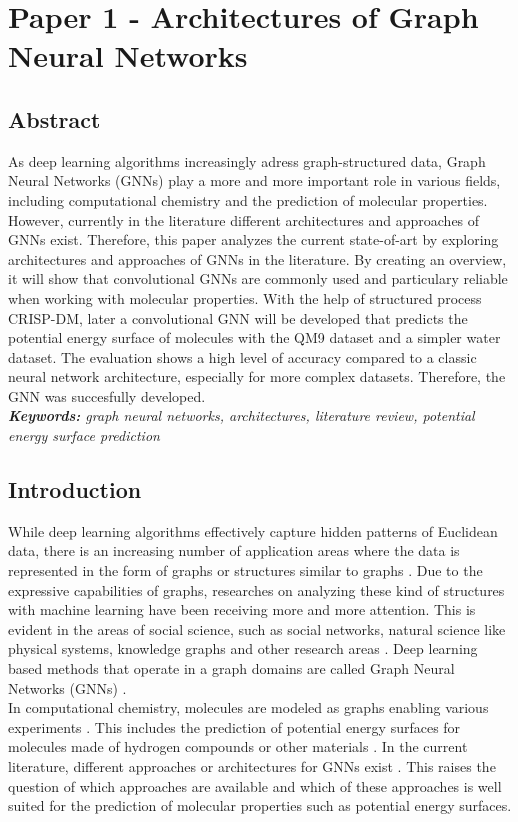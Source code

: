 
\chapter{Paper 1 - Architectures of Graph Neural Networks}

\section*{Abstract}

As deep learning algorithms increasingly adress graph-structured data, Graph Neural Networks (GNNs) play a more and more important role in various fields, including computational chemistry and the prediction of molecular properties. However, currently in the literature different architectures and approaches of GNNs exist. Therefore, this paper analyzes the current state-of-art by exploring architectures and approaches of GNNs in the literature. By creating an overview, it will show that convolutional GNNs are commonly used and particulary reliable when working with molecular properties. With the help of structured process CRISP-DM, later a convolutional GNN will be developed that predicts the potential energy surface of molecules with the QM9 dataset and a simpler water dataset. The evaluation shows a high level of accuracy compared to a classic neural network architecture, especially for more complex datasets. Therefore, the GNN was succesfully developed. \\


\textit{\textbf{Keywords:} graph neural networks, architectures, literature review, potential energy surface prediction}

\section{Introduction}
While deep learning algorithms effectively capture hidden patterns of Euclidean data, there is an increasing number of application areas where the data is represented in the form of graphs or structures similar to graphs \cite{wu_comprehensive_2021}. Due to the expressive capabilities of graphs, researches on analyzing these kind of structures with machine learning have been receiving more and more attention. This is evident in the areas of social science, such as social networks, natural science like physical systems, knowledge graphs and other research areas \cite{zhou_graph_2020}. Deep learning based methods that operate in a graph domains are called Graph Neural Networks (GNNs) \cite{velickovic_everything_2023}. \\ 
In computational chemistry, molecules are modeled as graphs enabling various experiments \cite{wu_comprehensive_2021}. This includes the prediction of potential energy surfaces for  molecules made of hydrogen compounds or other materials \cite{liu_computational_2023}. In the current literature, different approaches or architectures for GNNs exist \cite{wu_comprehensive_2021}. This raises the question of which approaches are available and which of these approaches is well suited for the prediction of molecular properties such as potential energy surfaces. \\

